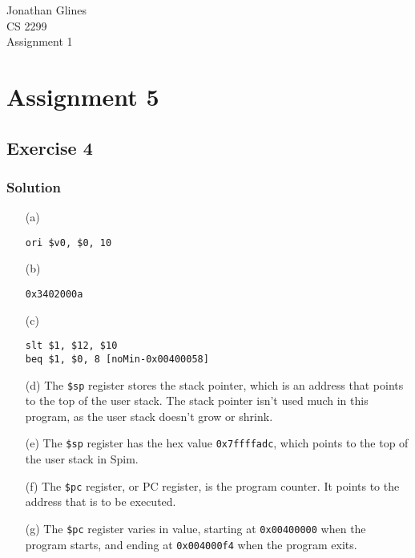 \documentclass[12pt]{article}
\begin{document}
\begin{flushright}
{\Large Jonathan Glines \\
CS 2299 \\
Assignment 1 \\
}
\end{flushright}
\section*{Assignment 5}
\subsection*{Exercise 4}
\subsubsection*{Solution}
\begin{itemize}
\item[(a)] \begin{verbatim}ori $v0, $0, 10\end{verbatim}
\item[(b)] \begin{verbatim}0x3402000a\end{verbatim}
\item[(c)] \begin{verbatim}
slt $1, $12, $10
beq $1, $0, 8 [noMin-0x00400058]
\end{verbatim}
\item[(d)] The {\tt \$sp} register stores the stack pointer, which is an address that points to the top of the user stack. The stack pointer isn't used much in this program, as the user stack doesn't grow or shrink.
\item[(e)] The {\tt \$sp} register has the hex value {\tt 0x7ffffadc}, which points to the top of the user stack in Spim.
\item[(f)] The {\tt \$pc} register, or PC register, is the program counter. It points to the address that is to be executed.
\item[(g)] The {\tt \$pc} register varies in value, starting at {\tt 0x00400000} when the program starts, and ending at {\tt 0x004000f4} when the program exits.
\end{itemize}
\end{document}
